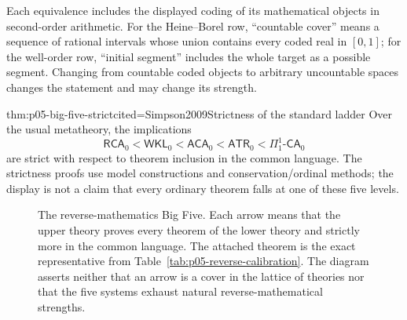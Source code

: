 Each equivalence includes the displayed coding of its mathematical objects in
second-order arithmetic.  For the Heine--Borel row, “countable cover” means a
sequence of rational intervals whose union contains every coded real in
\([0,1]\); for the well-order row, “initial segment” includes the whole target
as a possible segment.  Changing from countable coded objects to arbitrary
uncountable spaces changes the statement and may change its strength.

\begin{hbtheorem}{thm:p05-big-five-strict}{cited=Simpson2009}{Strictness of the standard ladder}
Over the usual metatheory, the implications
\[
 \mathsf{RCA}_0
 <\mathsf{WKL}_0
 <\mathsf{ACA}_0
 <\mathsf{ATR}_0
 <\Pi^1_1\text{-}\mathsf{CA}_0
\]
are strict with respect to theorem inclusion in the common language. The
strictness proofs use model constructions and conservation/ordinal methods;
the display is not a claim that every ordinary theorem falls at one of these
five levels.
\end{hbtheorem}

\begin{figure}[htbp]
\centering
{}
\caption{The reverse-mathematics Big Five.  Each arrow means
that the upper theory proves every theorem of the lower theory and strictly
more in the common language.  The attached theorem is the exact representative
from Table~\ref{tab:p05-reverse-calibration}.  The diagram asserts neither that
an arrow is a cover in the lattice of theories nor that the five systems
exhaust natural reverse-mathematical strengths.}
\label{fig:p05-big-five}
\end{figure}


